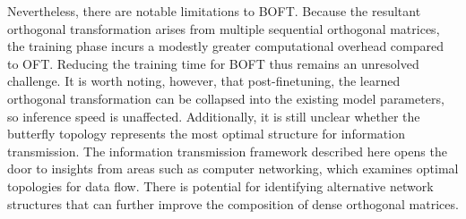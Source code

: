 Nevertheless, there are notable limitations to BOFT. Because the resultant orthogonal transformation arises from multiple sequential orthogonal matrices, the training phase incurs a modestly greater computational overhead compared to OFT. Reducing the training time for BOFT thus remains an unresolved challenge. It is worth noting, however, that post-finetuning, the learned orthogonal transformation can be collapsed into the existing model parameters, so inference speed is unaffected. Additionally, it is still unclear whether the butterfly topology represents the most optimal structure for information transmission. The information transmission framework described here opens the door to insights from areas such as computer networking, which examines optimal topologies for data flow. There is potential for identifying alternative network structures that can further improve the composition of dense orthogonal matrices.